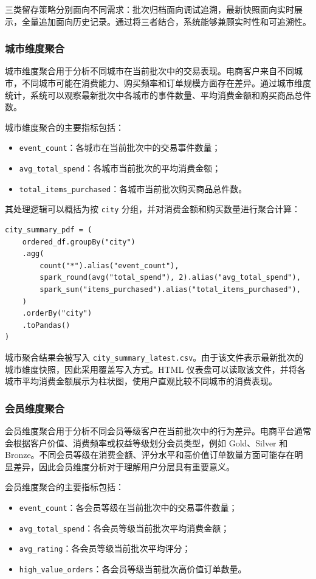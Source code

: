 \documentclass[12pt,hyperref,a4paper,UTF8]{ctexart}
\begin{document}
三类留存策略分别面向不同需求：批次归档面向调试追溯，最新快照面向实时展示，全量追加面向历史记录。通过将三者结合，系统能够兼顾实时性和可追溯性。

\subsubsection{城市维度聚合}

城市维度聚合用于分析不同城市在当前批次中的交易表现。电商客户来自不同城市，不同城市可能在消费能力、购买频率和订单规模方面存在差异。通过城市维度统计，系统可以观察最新批次中各城市的事件数量、平均消费金额和购买商品总件数。

城市维度聚合的主要指标包括：
\begin{itemize}
    \item \texttt{event\_count}：各城市在当前批次中的交易事件数量；
    \item \texttt{avg\_total\_spend}：各城市当前批次的平均消费金额；
    \item \texttt{total\_items\_purchased}：各城市当前批次购买商品总件数。
\end{itemize}

其处理逻辑可以概括为按 \texttt{city} 分组，并对消费金额和购买数量进行聚合计算：

\begin{verbatim}
city_summary_pdf = (
    ordered_df.groupBy("city")
    .agg(
        count("*").alias("event_count"),
        spark_round(avg("total_spend"), 2).alias("avg_total_spend"),
        spark_sum("items_purchased").alias("total_items_purchased"),
    )
    .orderBy("city")
    .toPandas()
)
\end{verbatim}

城市聚合结果会被写入 \texttt{city\_summary\_latest.csv}。由于该文件表示最新批次的城市维度快照，因此采用覆盖写入方式。HTML 仪表盘可以读取该文件，并将各城市平均消费金额展示为柱状图，使用户直观比较不同城市的消费表现。

\subsubsection{会员维度聚合}

会员维度聚合用于分析不同会员等级客户在当前批次中的行为差异。电商平台通常会根据客户价值、消费频率或权益等级划分会员类型，例如 Gold、Silver 和 Bronze。不同会员等级在消费金额、评分水平和高价值订单数量方面可能存在明显差异，因此会员维度分析对于理解用户分层具有重要意义。

会员维度聚合的主要指标包括：
\begin{itemize}
    \item \texttt{event\_count}：各会员等级在当前批次中的交易事件数量；
    \item \texttt{avg\_total\_spend}：各会员等级当前批次平均消费金额；
    \item \texttt{avg\_rating}：各会员等级当前批次平均评分；
    \item \texttt{high\_value\_orders}：各会员等级当前批次高价值订单数量。
\end{itemize}
\end{document}
